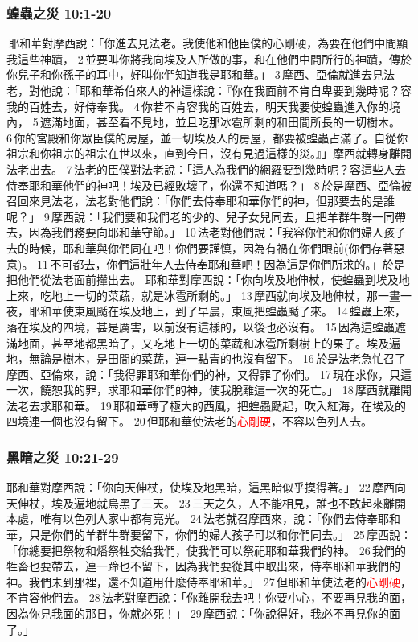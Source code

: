 \subsubsection{蝗蟲之災 10:1-20}
 耶和華對摩西說：「你進去見法老。我使他和他臣僕的心剛硬，為要在他們中間顯我這些神蹟， 2 並要叫你將我向埃及人所做的事，和在他們中間所行的神蹟，傳於你兒子和你孫子的耳中，好叫你們知道我是耶和華。」 3 摩西、亞倫就進去見法老，對他說：「耶和華希伯來人的神這樣說：『你在我面前不肯自卑要到幾時呢？容我的百姓去，好侍奉我。 4 你若不肯容我的百姓去，明天我要使蝗蟲進入你的境內， 5 遮滿地面，甚至看不見地，並且吃那冰雹所剩的和田間所長的一切樹木。 6 你的宮殿和你眾臣僕的房屋，並一切埃及人的房屋，都要被蝗蟲占滿了。自從你祖宗和你祖宗的祖宗在世以來，直到今日，沒有見過這樣的災。』」摩西就轉身離開法老出去。 7 法老的臣僕對法老說：「這人為我們的網羅要到幾時呢？容這些人去侍奉耶和華他們的神吧！埃及已經敗壞了，你還不知道嗎？」 8 於是摩西、亞倫被召回來見法老，法老對他們說：「你們去侍奉耶和華你們的神，但那要去的是誰呢？」 9 摩西說：「我們要和我們老的少的、兒子女兒同去，且把羊群牛群一同帶去，因為我們務要向耶和華守節。」 10 法老對他們說：「我容你們和你們婦人孩子去的時候，耶和華與你們同在吧！你們要謹慎，因為有禍在你們眼前(你們存著惡意)。 11 不可都去，你們這壯年人去侍奉耶和華吧！因為這是你們所求的。」於是把他們從法老面前攆出去。
耶和華對摩西說：「你向埃及地伸杖，使蝗蟲到埃及地上來，吃地上一切的菜蔬，就是冰雹所剩的。」 13 摩西就向埃及地伸杖，那一晝一夜，耶和華使東風颳在埃及地上，到了早晨，東風把蝗蟲颳了來。 14 蝗蟲上來，落在埃及的四境，甚是厲害，以前沒有這樣的，以後也必沒有。 15 因為這蝗蟲遮滿地面，甚至地都黑暗了，又吃地上一切的菜蔬和冰雹所剩樹上的果子。埃及遍地，無論是樹木，是田間的菜蔬，連一點青的也沒有留下。 16 於是法老急忙召了摩西、亞倫來，說：「我得罪耶和華你們的神，又得罪了你們。 17 現在求你，只這一次，饒恕我的罪，求耶和華你們的神，使我脫離這一次的死亡。」 18 摩西就離開法老去求耶和華。 19 耶和華轉了極大的西風，把蝗蟲颳起，吹入紅海，在埃及的四境連一個也沒有留下。 20 但耶和華使法老的\textcolor{red}{心剛硬}，不容以色列人去。


\subsubsection{黑暗之災 10:21-29}
耶和華對摩西說：「你向天伸杖，使埃及地黑暗，這黑暗似乎摸得著。」 22 摩西向天伸杖，埃及遍地就烏黑了三天。 23 三天之久，人不能相見，誰也不敢起來離開本處，唯有以色列人家中都有亮光。 24 法老就召摩西來，說：「你們去侍奉耶和華，只是你們的羊群牛群要留下，你們的婦人孩子可以和你們同去。」 25 摩西說：「你總要把祭物和燔祭牲交給我們，使我們可以祭祀耶和華我們的神。 26 我們的牲畜也要帶去，連一蹄也不留下，因為我們要從其中取出來，侍奉耶和華我們的神。我們未到那裡，還不知道用什麼侍奉耶和華。」 27 但耶和華使法老的\textcolor{red}{心剛硬}，不肯容他們去。 28 法老對摩西說：「你離開我去吧！你要小心，不要再見我的面，因為你見我面的那日，你就必死！」 29 摩西說：「你說得好，我必不再見你的面了。」

